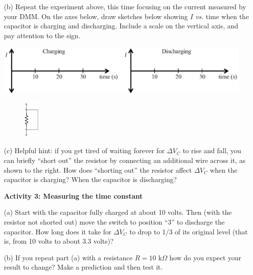 (b) Repeat the experiment above, this time focusing on the current measured by your DMM.  On the axes below, draw sketches below showing $I$ \textit{vs.} time when the capacitor is charging and discharging.  Include a scale on the vertical axis, and pay attention to the sign.
\begin{center}
\vspace{-0.3 in}
\includegraphics[width=0.95\textwidth]{rc_circuits/current_axes.eps}
\vspace{-0.1 in}
\end{center}

\begin{figure}
    \vspace{-0.2 in}
\includegraphics[width=0.07\textwidth]{rc_circuits/shorted_resistor_bw.eps}
\end{figure}


(c)  Helpful hint: if you get tired of waiting forever for $\Delta V_C$ to rise and fall, you can briefly ``short out'' the resistor by connecting an additional wire across it, as shown to the right.  
How does ``shorting out'' the resistor affect $\Delta V_C$ when the capacitor is charging?  When the capacitor is discharging?
\answerspace{0.7in}

\pagebreak[2]
\textbf{Activity 3: Measuring the time constant}

(a) Start with the capacitor fully charged at about 10 volts.  Then (with the resistor not shorted out) move the switch to position “3” to discharge the capacitor.  How long does it take for $\Delta V_C$ to drop to 1/3 of its original level (that is, from 10 volts to about 3.3 volts)?
\vspace{0.8in}

(b) If you repeat part (a) with a resistance $R = 10$ k$\Omega$ how do you expect your result to change?  Make a prediction and then test it.

